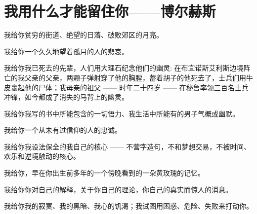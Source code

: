 \section{我用什么才能留住你——博尔赫斯}

我给你贫穷的街道、绝望的日落、破败郊区的月亮。

我给你一个久久地望着孤月的人的悲哀。

我给你我已死去的先辈，人们用大理石纪念他们的幽灵:
在布宜诺斯艾利斯边境阵亡的我父亲的父亲，两颗子弹射穿了他的胸膛，蓄着胡子的他死去了，士兵们用牛皮裹起他的尸体；我母亲的祖父 —— 时年二十四岁 —— 在秘鲁率领三百名士兵冲锋，如今都成了消失的马背上的幽灵。

我给你我写的书中所能包含的一切悟力、我生活中所能有的男子气概或幽默。

我给你一个从未有过信仰的人的忠诚。

我给你我设法保全的我自己的核心 —— 不营字造句，不和梦想交易，不被时间、欢乐和逆境触动的核心。

我给你，早在你出生前多年的一个傍晚看到的一朵黄玫瑰的记忆。

我给你你对自己的解释，关于你自己的理论，你自己的真实而惊人的消息。

我给你我的寂寞、我的黑暗、我心的饥渴；我试图用困惑、危险、失败来打动你。